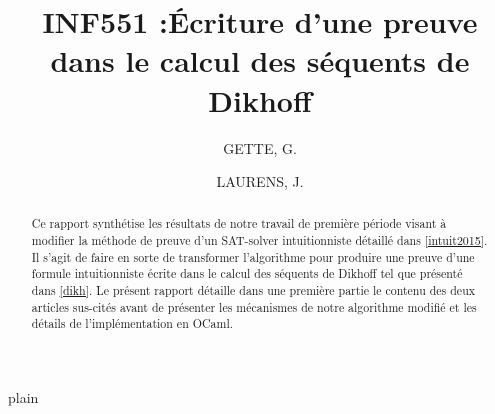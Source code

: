 \documentclass[10pt, a4paper]{amsart}
\title{INF551 :\'Ecriture d'une preuve dans le calcul des s\'equents de Dikhoff
}
\author{GETTE, G. \and LAURENS, J.}
\begin{document}
\begin{abstract}
  Ce rapport synth\'etise les résultats de notre travail de premi\`ere p\'eriode visant à modifier la méthode de preuve d'un SAT-solver intuitionniste détaillé dans \ref{intuit2015}. Il s'agit de faire en sorte de transformer l'algorithme pour produire une preuve d'une formule intuitionniste écrite dans le calcul des séquents de Dikhoff tel que pr\'esent\'e dans \ref{dikh}.
Le présent rapport d\'etaille dans une premi\`ere partie le contenu des deux articles sus-cit\'es avant de pr\'esenter les mécanismes de notre algorithme modifi\'e et les d\'etails de l'impl\'ementation en OCaml.
\end{abstract}

\maketitle
\tableofcontents
\newpage





{plain}
\end{document}
